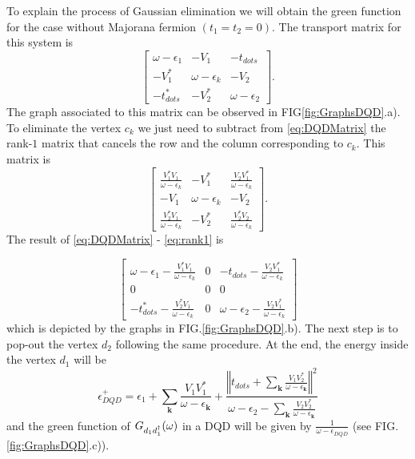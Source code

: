 \documentclass[showpacs,aps,prb,reprint,superscriptaddress]{revtex4-1}
\begin{document}
To explain the process of Gaussian elimination we will obtain the green function for the case without Majorana fermion $(t_1= t_2=0)$.  The transport matrix for this system is 
\begin{equation}
        \left[\begin{array}{ccc}
    \omega-\epsilon_{1} & -V_{1} & -t_{dots}\\
    -V_{1}^{*} & \omega-\epsilon_{k} & -V_{2}\\
    -t_{dots}^{*} & -V_{2}^{*} & \omega-\epsilon_{2}
    \end{array}\right]. \label{eq:DQDMatrix}
\end{equation}
\noindent The graph associated to this matrix can be observed in FIG\ref{fig:GraphsDQD}.a). To eliminate the vertex $c_k$ we just need to subtract from \eqref{eq:DQDMatrix} the rank-$1$ matrix that cancels the row and the column corresponding to $c_k$. This matrix is 
\begin{equation}
        \left[\begin{array}{ccc}
    \frac{V_{1}^{*}V_{1}}{\omega-\epsilon_{k}} & -V_{1}^{*} & \frac{V_{2}V_{1}^{*}}{\omega-\epsilon_{k}}\\
    -V_{1} & \omega-\epsilon_{k} & -V_{2}\\
    \frac{V_{2}^{*}V_{1}}{\omega-\epsilon_{k}} & -V_{2}^{*} & \frac{V_{2}^{*}V_{2}}{\omega-\epsilon_{k}}
    \end{array}\right]. \label{eq:rank1}
\end{equation}
The result of \eqref{eq:DQDMatrix} -  \eqref{eq:rank1} is 

\begin{equation}
        \left[\begin{array}{ccc}
    \omega-\epsilon_{1}-\frac{V_{1}^{*}V_{1}}{\omega-\epsilon_{k}} & 0 & -t_{dots}-\frac{V_{2}V_{1}^{*}}{\omega-\epsilon_{k}}\\
    0 & 0 & 0\\
    -t_{dots}^{*}-\frac{V_{2}^{*}V_{1}}{\omega-\epsilon_{k}} & 0 & \omega-\epsilon_{2}-\frac{V_{2}V_{1}^{*}}{\omega-\epsilon_{k}}
    \end{array}\right]
\end{equation}
\noindent which is depicted by the graphs in FIG.\ref{fig:GraphsDQD}.b). The next step is to pop-out the vertex $d_2$ following the same procedure. At the end, the energy inside the vertex $d_1$ will be
\begin{equation}
    \epsilon^+_{DQD}=\epsilon_{1}+\sum_{\mathbf{k}}\frac{V_{1}V_{1}^{*}}{\omega-\epsilon_{\mathbf{k}}}+\frac{\left\Vert t_{dots}+\sum_{\mathbf{k}}\frac{V_{1}V_{2}^{*}}{\omega-\epsilon_{\mathbf{k}}}\right\Vert ^{2}}{\omega-\epsilon_{2}-\sum_{\mathbf{k}}\frac{V_{2}V_{2}^{*}}{\omega-\epsilon_{\mathbf{k}}}} \label{eq:EnDQD}
\end{equation}
and the green function of $G_{d_1d^\dagger_1}(\omega)$ in a DQD will be given by $\frac{1}{\omega -  \epsilon_{DQD}}$ (see FIG.\ref{fig:GraphsDQD}.c)).
\end{document}
